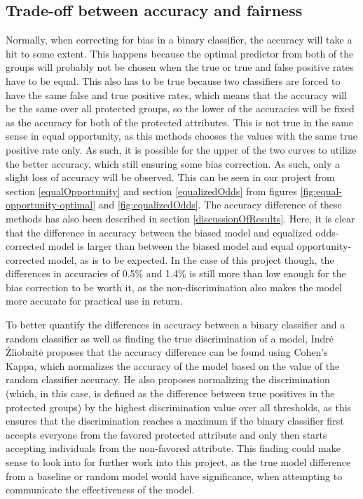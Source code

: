 \documentclass[11pt, fleqn, titlepage]{article}
\begin{document}
	\subsection{Trade-off between accuracy and fairness}\label{tradeoff}
	Normally, when correcting for bias in a binary classifier, the accuracy will take a hit to some extent. This happens because the optimal predictor from both of the groups will probably not be chosen when the true or true and false positive rates have to be equal. This also has to be true because two classifiers are forced to have the same false and true positive rates, which means that the accuracy will be the same over all protected groups, so the lower of the accuracies will be fixed as the accuracy for both of the protected attributes. This is not true in the same sense in equal opportunity, as this methods chooses the values with the same true positive rate only. As such, it is possible for the upper of the two curves to utilize the better accuracy, which still ensuring some bias correction. As such, only a slight loss of accuracy will be observed. \cite{equal_of_oppor} This can be seen in our project from section \ref{equalOpportunity} and section \ref{equalizedOdds} from figures \ref{fig:equal-opportunity-optimal} and \ref{fig:equalizedOdds}. The accuracy difference of these methods has also been described in section \ref{discussionOfResults}. Here, it is clear that the difference in accuracy between the biased model and equalized odds-corrected model is larger than between the biased model and equal opportunity-corrected model, as is to be expected. In the case of this project though, the differences in accuracies of 0.5\% and 1.4\% is still more than low enough for the bias correction to be worth it, as the non-discrimination also makes the model more accurate for practical use in return.
	
	To better quantify the differences in accuracy between a binary classifier and a random classifier as well as finding the true discrimination of a model, Indrė Žliobaitė proposes that the accuracy difference can be found using Cohen's Kappa, which normalizes the accuracy of the model based on the value of the random classifier accuracy. He also proposes normalizing the discrimination (which, in this case, is defined as the difference between true positives in the protected groups) by the highest discrimination value over all thresholds, as this ensures that the discrimination reaches a maximum if the binary classifier first accepts everyone from the favored protected attribute and only then starts accepting individuals from the non-favored attribute. This finding could make sense to look into for further work into this project, as the true model difference from a baseline or random model would have significance, when attempting to communicate the effectiveness of the model. \cite{bias-accuracy}
	
\end{document}
